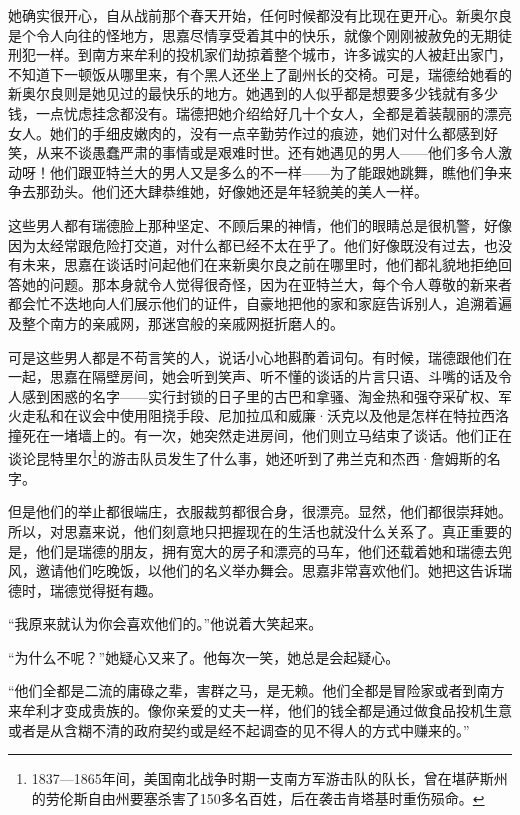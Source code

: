\par 她确实很开心，自从战前那个春天开始，任何时候都没有比现在更开心。新奥尔良是个令人向往的怪地方，思嘉尽情享受着其中的快乐，就像个刚刚被赦免的无期徒刑犯一样。到南方来牟利的投机家们劫掠着整个城市，许多诚实的人被赶出家门，不知道下一顿饭从哪里来，有个黑人还坐上了副州长的交椅。可是，瑞德给她看的新奥尔良则是她见过的最快乐的地方。她遇到的人似乎都是想要多少钱就有多少钱，一点忧虑挂念都没有。瑞德把她介绍给好几十个女人，全都是着装靓丽的漂亮女人。她们的手细皮嫩肉的，没有一点辛勤劳作过的痕迹，她们对什么都感到好笑，从来不谈愚蠢严肃的事情或是艰难时世。还有她遇见的男人——他们多令人激动呀！他们跟亚特兰大的男人又是多么的不一样——为了能跟她跳舞，瞧他们争来争去那劲头。他们还大肆恭维她，好像她还是年轻貌美的美人一样。
\par 这些男人都有瑞德脸上那种坚定、不顾后果的神情，他们的眼睛总是很机警，好像因为太经常跟危险打交道，对什么都已经不太在乎了。他们好像既没有过去，也没有未来，思嘉在谈话时问起他们在来新奥尔良之前在哪里时，他们都礼貌地拒绝回答她的问题。那本身就令人觉得很奇怪，因为在亚特兰大，每个令人尊敬的新来者都会忙不迭地向人们展示他们的证件，自豪地把他的家和家庭告诉别人，追溯着遍及整个南方的亲戚网，那迷宫般的亲戚网挺折磨人的。
\par 可是这些男人都是不苟言笑的人，说话小心地斟酌着词句。有时候，瑞德跟他们在一起，思嘉在隔壁房间，她会听到笑声、听不懂的谈话的片言只语、斗嘴的话及令人感到困惑的名字——实行封锁的日子里的古巴和拿骚、淘金热和强夺采矿权、军火走私和在议会中使用阻挠手段、尼加拉瓜和威廉·沃克以及他是怎样在特拉西洛撞死在一堵墙上的。有一次，她突然走进房间，他们则立马结束了谈话。他们正在谈论昆特里尔\footnote{1837—1865年间，美国南北战争时期一支南方军游击队的队长，曾在堪萨斯州的劳伦斯自由州要塞杀害了150多名百姓，后在袭击肯塔基时重伤殒命。}的游击队员发生了什么事，她还听到了弗兰克和杰西·詹姆斯的名字。
\par 但是他们的举止都很端庄，衣服裁剪都很合身，很漂亮。显然，他们都很崇拜她。所以，对思嘉来说，他们刻意地只把握现在的生活也就没什么关系了。真正重要的是，他们是瑞德的朋友，拥有宽大的房子和漂亮的马车，他们还载着她和瑞德去兜风，邀请他们吃晚饭，以他们的名义举办舞会。思嘉非常喜欢他们。她把这告诉瑞德时，瑞德觉得挺有趣。
\par “我原来就认为你会喜欢他们的。”他说着大笑起来。
\par “为什么不呢？”她疑心又来了。他每次一笑，她总是会起疑心。
\par “他们全都是二流的庸碌之辈，害群之马，是无赖。他们全都是冒险家或者到南方来牟利才变成贵族的。像你亲爱的丈夫一样，他们的钱全都是通过做食品投机生意或者是从含糊不清的政府契约或是经不起调查的见不得人的方式中赚来的。”
